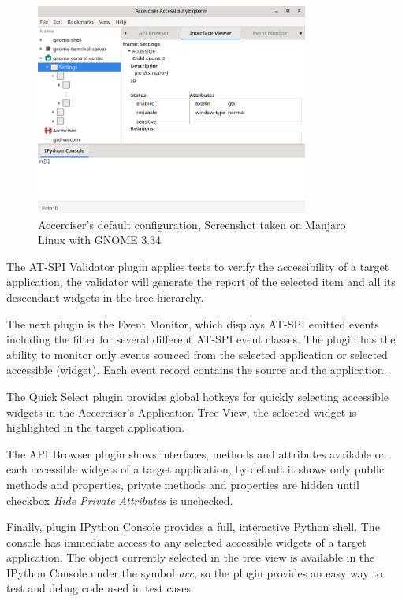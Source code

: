 \begin{figure}[H]
	\centering
	\includegraphics[width=0.8\textwidth]{obrazky-figures/accerciser.png}
	\caption{Accerciser's default configuration, Screenshot taken on Manjaro Linux with GNOME 3.34}
	\label{Accerciser_img}
\end{figure}

The AT-SPI Validator plugin applies tests to verify the accessibility of a target application, the validator will generate the report of the selected item and all its descendant widgets in the tree hierarchy.

The next plugin is the Event Monitor, which displays AT-SPI emitted events including the filter for several different AT-SPI event classes. The plugin has the ability to monitor only events sourced from the selected application or selected accessible (widget). Each event record contains the source and the application.

The Quick Select plugin provides global hotkeys for quickly selecting accessible widgets in the Accerciser's Application Tree View, the selected widget is highlighted in the target application.

The API Browser plugin shows interfaces, methods and attributes available on each accessible widgets of a target application, by default it shows only public methods and properties, private methods and properties are hidden until checkbox \textit{Hide Private Attributes} is unchecked.
 
Finally, plugin IPython Console provides a full, interactive Python shell. The console has immediate access to any selected accessible widgets of a target application. The object currently selected in the tree view is available in the IPython Console under the symbol \textit{acc}, so the plugin provides an easy way to test and debug code used in test cases.    

